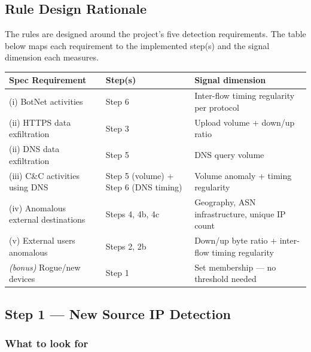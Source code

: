 \documentclass[
  11pt,
]{article}
\begin{document}
\hypertarget{rule-design-rationale}{%
\subsection{Rule Design Rationale}\label{rule-design-rationale}}

The rules are designed around the project's five detection requirements.
The table below maps each requirement to the implemented step(s) and the
signal dimension each measures.

\begin{longtable}[]{@{}
  >{\raggedright\arraybackslash}p{}
  >{\raggedright\arraybackslash}p{}
  >{\raggedright\arraybackslash}p{}@{}}
\toprule\noalign{}
Spec Requirement & Step(s) & Signal dimension \\
\midrule\noalign{}
\endhead
\bottomrule\noalign{}
\endlastfoot
(i) BotNet activities & Step 6 & Inter-flow timing regularity per protocol \\
(ii) HTTPS data exfiltration & Step 3 & Upload volume + down/up ratio \\
(ii) DNS data exfiltration & Step 5 & DNS query volume \\
(iii) C\&C activities using DNS & Step 5 (volume) + Step 6 (DNS timing) & Volume anomaly + timing regularity \\
(iv) Anomalous external destinations & Steps 4, 4b, 4c & Geography, ASN infrastructure, unique IP count \\
(v) External users anomalous & Steps 2, 2b & Down/up byte ratio + inter-flow timing regularity \\
\textit{(bonus)} Rogue/new devices & Step 1 & Set membership — no threshold needed \\
\end{longtable}



\hypertarget{new-source-ip-detection}{%
\subsection{Step 1 — New Source IP Detection}\label{new-source-ip-detection}}

\hypertarget{what-to-look-for}{%
\subsubsection{What to look for}\label{what-to-look-for}}
\end{document}

